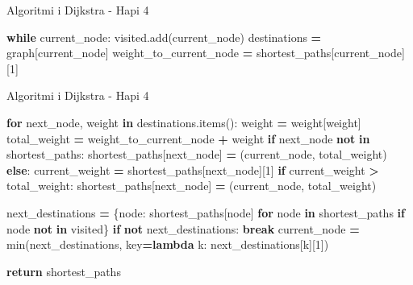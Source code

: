 \documentclass[
  ignorenonframetext,
]{beamer}
\newenvironment{Shaded}{\begin{snugshade}}{\end{snugshade}}
\newcommand{\BuiltInTok}[1]{#1}
\newcommand{\ControlFlowTok}[1]{\textcolor[rgb]{0.13,0.29,0.53}{\textbf{#1}}}
\newcommand{\DecValTok}[1]{\textcolor[rgb]{0.00,0.00,0.81}{#1}}
\newcommand{\KeywordTok}[1]{\textcolor[rgb]{0.13,0.29,0.53}{\textbf{#1}}}
\newcommand{\NormalTok}[1]{#1}
\newcommand{\OperatorTok}[1]{\textcolor[rgb]{0.81,0.36,0.00}{\textbf{#1}}}
\newcommand{\StringTok}[1]{\textcolor[rgb]{0.31,0.60,0.02}{#1}}
\begin{document}
\begin{frame}[fragile]{Algoritmi i Dijkstra - Hapi 4}
\begin{Shaded}
\begin{Highlighting}[]
    \ControlFlowTok{while}\NormalTok{ current\_node:}
\NormalTok{        visited.add(current\_node)}
\NormalTok{        destinations }\OperatorTok{=}\NormalTok{ graph[current\_node]}
\NormalTok{        weight\_to\_current\_node }\OperatorTok{=}\NormalTok{ shortest\_paths[current\_node][}\DecValTok{1}\NormalTok{]}
\end{Highlighting}
\end{Shaded}
\end{frame}

\begin{frame}[fragile]{Algoritmi i Dijkstra - Hapi 4}
\protect\hypertarget{algoritmi-i-dijkstra---hapi-4-2}{}

\begin{Shaded}
\begin{Highlighting}[]
        \ControlFlowTok{for}\NormalTok{ next\_node, weight }\KeywordTok{in}\NormalTok{ destinations.items():}
\NormalTok{            weight }\OperatorTok{=}\NormalTok{ weight[}\StringTok{\textquotesingle{}weight\textquotesingle{}}\NormalTok{]}
\NormalTok{            total\_weight }\OperatorTok{=}\NormalTok{ weight\_to\_current\_node }\OperatorTok{+}\NormalTok{ weight}
            \ControlFlowTok{if}\NormalTok{ next\_node }\KeywordTok{not} \KeywordTok{in}\NormalTok{ shortest\_paths:}
\NormalTok{                shortest\_paths[next\_node] }\OperatorTok{=}\NormalTok{ (current\_node, total\_weight)}
            \ControlFlowTok{else}\NormalTok{:}
\NormalTok{                current\_weight }\OperatorTok{=}\NormalTok{ shortest\_paths[next\_node][}\DecValTok{1}\NormalTok{]}
                \ControlFlowTok{if}\NormalTok{ current\_weight }\OperatorTok{\textgreater{}}\NormalTok{ total\_weight:}
\NormalTok{                    shortest\_paths[next\_node] }\OperatorTok{=}\NormalTok{ (current\_node, total\_weight)}

\NormalTok{        next\_destinations }\OperatorTok{=}\NormalTok{ \{node: shortest\_paths[node] }\ControlFlowTok{for}\NormalTok{ node }\KeywordTok{in}\NormalTok{ shortest\_paths }\ControlFlowTok{if}\NormalTok{ node }\KeywordTok{not} \KeywordTok{in}\NormalTok{ visited\}}
        \ControlFlowTok{if} \KeywordTok{not}\NormalTok{ next\_destinations:}
            \ControlFlowTok{break}
\NormalTok{        current\_node }\OperatorTok{=} \BuiltInTok{min}\NormalTok{(next\_destinations, key}\OperatorTok{=}\KeywordTok{lambda}\NormalTok{ k: next\_destinations[k][}\DecValTok{1}\NormalTok{])}

    \ControlFlowTok{return}\NormalTok{ shortest\_paths}
\end{Highlighting}
\end{Shaded}
\end{frame}
\end{document}

